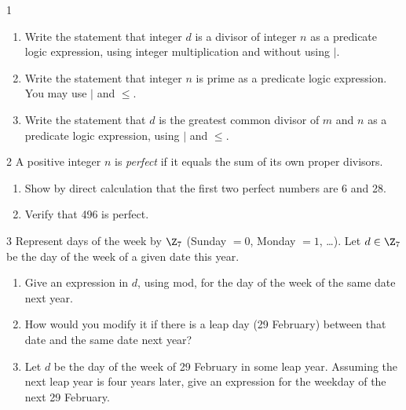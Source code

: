 
\begin{exercise}{1}
    \begin{enumerate}[label=(\alph*)]
        \item Write the statement that integer $d$ is a divisor of integer $n$ as
              a predicate logic expression, using integer multiplication and
              without using $\mid$.
        \item Write the statement that integer $n$ is prime as a predicate logic
              expression. You may use $\mid$ and $\le$.
        \item Write the statement that $d$ is the greatest common divisor of $m$
              and $n$ as a predicate logic expression, using $\mid$ and $\le$.
    \end{enumerate}
\end{exercise}

\begin{exercise}{2}
    A positive integer $n$ is \emph{perfect} if it equals the sum of its own
    proper divisors.
    \begin{enumerate}[label=(\alph*)]
        \item Show by direct calculation that the first two perfect numbers are
              6 and 28.
        \item Verify that 496 is perfect.
    \end{enumerate}
\end{exercise}

\begin{exercise}{3}
    Represent days of the week by $\Z_7$ (Sunday $=0$, Monday $=1$, \ldots). Let
    $d\in\Z_7$ be the day of the week of a given date this year.
    \begin{enumerate}[label=(\alph*)]
        \item Give an expression in $d$, using mod, for the day of the week of
              the same date next year.
        \item How would you modify it if there is a leap day (29 February)
              between that date and the same date next year?
        \item Let $d$ be the day of the week of 29 February in some leap year.
              Assuming the next leap year is four years later, give an expression
              for the weekday of the next 29 February.
    \end{enumerate}
\end{exercise}

